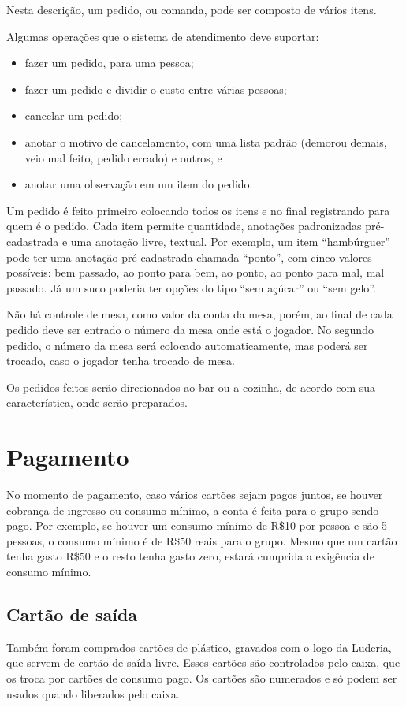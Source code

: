 Nesta descrição, um pedido, ou comanda, pode ser composto de vários itens.

Algumas operações que o sistema de atendimento deve suportar:
\begin{itemize}
    \item fazer um pedido, para uma pessoa;
    \item fazer um pedido e dividir o custo entre várias pessoas; 
    \item cancelar um pedido;
    \item anotar o motivo de cancelamento, com uma lista padrão (demorou demais, veio mal feito, pedido errado) e outros, e
    \item anotar uma observação em um item do pedido.
\end{itemize}

Um pedido é feito primeiro colocando todos os itens e no final registrando para quem é o pedido. Cada item permite quantidade, anotações padronizadas pré-cadastrada e uma anotação livre, textual. Por exemplo, um item ``hambúrguer'' pode ter uma anotação pré-cadastrada chamada ``ponto'', com cinco valores possíveis:  bem passado, ao ponto para bem, ao ponto, ao ponto para mal, mal passado.
Já um suco poderia ter opções do tipo ``sem açúcar'' ou ``sem gelo''.

Não há controle de mesa, como valor da conta da mesa, porém, ao final de cada pedido deve ser entrado o número da mesa onde está o jogador. No segundo pedido, o número da mesa será colocado automaticamente, mas poderá ser trocado, caso o jogador tenha trocado de mesa.

Os pedidos feitos serão direcionados ao bar ou a cozinha, de acordo com sua característica, onde serão preparados. 

\section{Pagamento}

No momento de pagamento, caso vários cartões sejam pagos juntos, se houver cobrança de ingresso ou consumo mínimo, a conta é feita para o grupo sendo pago. Por exemplo, se houver um consumo mínimo de R\$10 por pessoa e são 5 pessoas, o consumo mínimo é de R\$50 reais para o grupo. Mesmo que um cartão tenha gasto R\$50 e o resto tenha gasto zero, estará cumprida a exigência de consumo mínimo. 

\subsection{Cartão de saída}
Também foram comprados cartões de plástico, gravados com o logo da Luderia,  que servem de cartão de saída livre. Esses cartões são controlados pelo caixa, que os troca por cartões de consumo pago. Os cartões são numerados e só podem ser usados quando liberados pelo caixa.


